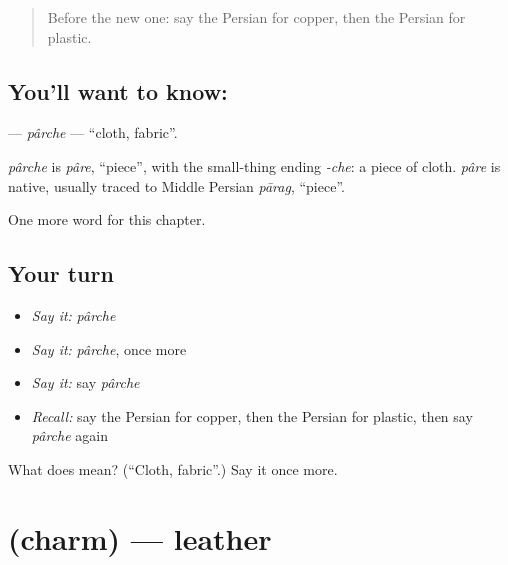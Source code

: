 \label{lesson:FA-C173-parche}



\begin{quote}
Before the new one: say the Persian for copper, then the Persian for plastic.
\end{quote}

\subsection*{You'll want to know: }
\textbf{} — \emph{pârche} — \textquotedblleft{}cloth, fabric\textquotedblright{}.

\begin{cousinweb}
\emph{pârche} is \emph{pâre}, \textquotedblleft{}piece\textquotedblright{}, with the small-thing ending \emph{-che}: a piece of cloth. \emph{pâre} is native, usually traced to Middle Persian \emph{pārag}, \textquotedblleft{}piece\textquotedblright{}.
\end{cousinweb}

\begin{grammarlens}[title={What you've built}]
One more word for this chapter.
\end{grammarlens}

\subsection*{Your turn}
\begin{itemize}
\raggedright
  \item \emph{Say it:} \emph{pârche}
  \item \emph{Say it:} \emph{pârche}, once more
  \item \emph{Say it:} say \emph{pârche}
  \item \emph{Recall:} say the Persian for copper, then the Persian for plastic, then say \emph{pârche} again
\end{itemize}

\begin{tcolorbox}[breakable,colback=teal!4,colframe=teal!35!black,title={Before you move on}]
What does  mean? (\textquotedblleft{}Cloth, fabric\textquotedblright{}.) Say it once more.
\end{tcolorbox}
\section[\texorpdfstring{\fa{چرم} (charm)}{چرم (charm)}]{ (charm) — leather}

